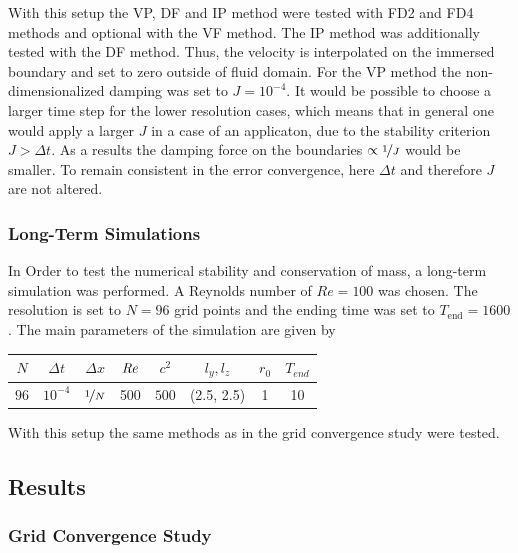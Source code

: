 With this setup the VP, DF and IP method were tested with FD2 and FD4 methods and optional with the VF method.
The IP method was additionally tested with the DF method. Thus, the velocity is interpolated on the
immersed boundary and set to zero outside of fluid domain.
For the VP method the non-dimensionalized damping was set to $J=10^{-4}$.
It would be possible to choose a larger time step for the lower resolution cases, which means that in general
one would apply a larger $J$ in a case of an applicaton, due to the stability criterion $J>\Delta t$.
As a results the damping force on the boundaries $\propto \nicefrac{1}{J}$ would be smaller.
To remain consistent in the error convergence, here $\Delta t$ and
therefore $J$ are not altered.

\subsubsection{Long-Term Simulations}

In Order to test the  numerical stability and conservation of mass, a long-term simulation was performed.
A Reynolds number of $Re=100$ was chosen. The resolution is set to $N=96$ grid points and
the ending time was set to $T_{\text{end}}=1600$.
The main parameters of the simulation are  given by

\begin{center}
\vspace*{0.7ex}
\begin{tabular}{c|c|c|c|c|c|c|c }
 $ N  $                   & $\Delta t$ & $\Delta x$            & $\mbox{\textit{Re}}$  & $c^2$   & $l_y, l_z$ &$r_0$ & $T_{end}$\\
\hline
 $96 $& $10^{-4}$ & $\nicefrac{1}{N}$ & 500     & $500$   & (2.5, 2.5)  & 1     & 10\\
\end{tabular}
\vspace*{0.7ex}
\end{center}

With this setup the same methods as in the grid convergence study were tested.

\subsection{Results}

\subsubsection{Grid Convergence Study}

